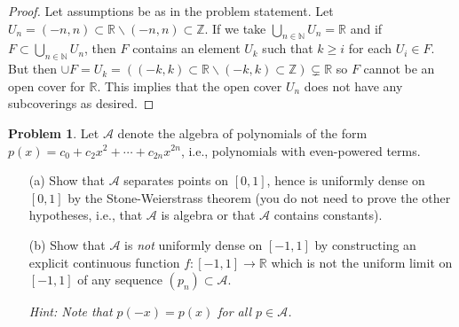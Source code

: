 \documentclass[11pt]{article}
\theoremstyle{definition}
\newtheorem{problem}{Problem}
\newcommand{\N}{\mathbb{N}}
\newcommand{\R}{\mathbb{R}}
\newcommand{\Z}{\mathbb{Z}}
\begin{document}
\begin{proof}
Let assumptions be as in the problem statement. Let $U_n = (-n, n)\subset \R \backslash (-n, n)\subset \Z$. If we take $\bigcup_{n\in \N}U_n = \R$ and if $F\subset\bigcup_{n\in \N}U_n$, then $F$ contains an element $U_k$ such that $k\geq i$ for each $U_i \in F$. But then $\cup F = U_k = ((-k, k)\subset \R \backslash (-k, k)\subset \Z) \subsetneq \R$ so $F$ cannot be an open cover for $\R.$ This implies that the open cover $U_n$ does not have any subcoverings as desired.
\end{proof}

\pagebreak
\begin{problem}
Let $\mathcal A$ denote the algebra of polynomials of the form 
$p(x) = c_0 + c_2 x^2 + \cdots + c_{2n} x^{2n}$, i.e., polynomials with even-powered terms. 
\begin{itemize}
\item[(a)] Show that $\mathcal A$ separates points on $[0,1]$, hence is uniformly dense on $[0,1]$ by the Stone-Weierstrass theorem (you do not need to prove the other hypotheses, i.e., that $\mathcal A$ is algebra or that $\mathcal A$ contains constants). 
\item[(b)] Show that $\mathcal A$ is \emph{not} uniformly dense on $[-1,1]$ by constructing an explicit continuous function $f : [-1,1] \to \R$ which is not the uniform limit on $[-1,1]$ of any sequence $(p_n) \subset \mathcal A$. 

{\it Hint: Note that $p(-x) = p(x)$ for all $p \in \mathcal A$.}
\end{itemize}
\end{problem}
\end{document}
